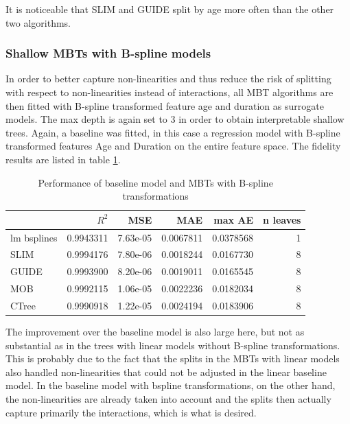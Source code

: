 It is noticeable that SLIM and GUIDE split by age more often than the other two algorithms.

\subsubsection{Shallow MBTs with B-spline models}

In order to better capture non-linearities and thus reduce the risk of splitting with respect to non-linearities instead of interactions, all MBT algorithms are then fitted with B-spline transformed feature age and duration as surrogate models. The max depth is again set to 3 in order to obtain interpretable shallow trees. Again, a baseline was fitted, in this case a regression model with B-spline transformed features Age and Duration on the entire feature space. The fidelity results are listed in table \ref{tab:ins_k2204_bsplines_small_surrogates_perf}.

\begin{table}

\caption{Performance of baseline model and MBTs with B-spline transformations}
\centering
\begin{tabular}[t]{l|r|r|r|r|r}
\hline
  & $R^2$ & MSE & MAE & max AE & n leaves\\
\hline
lm bsplines & 0.9943311 & 7.63e-05 & 0.0067811 & 0.0378568 & 1\\
\hline
SLIM & 0.9994176 & 7.80e-06 & 0.0018244 & 0.0167730 & 8\\
GUIDE & 0.9993900 & 8.20e-06 & 0.0019011 & 0.0165545 & 8\\
MOB & 0.9992115 & 1.06e-05 & 0.0022236 & 0.0182034 & 8\\
CTree & 0.9990918 & 1.22e-05 & 0.0024194 & 0.0183906 & 8\\
\hline
\end{tabular}
\label{tab:ins_k2204_bsplines_small_surrogates_perf}
\end{table}

The improvement over the baseline model is also large here, but not as substantial as in the trees with linear models without B-spline transformations. This is probably due to the fact that the splits in the MBTs with linear models also handled non-linearities that could not be adjusted in the linear baseline model. In the baseline model with bspline transformations, on the other hand, the non-linearities are already taken into account and the splits then actually capture primarily the interactions, which is what is desired. 



